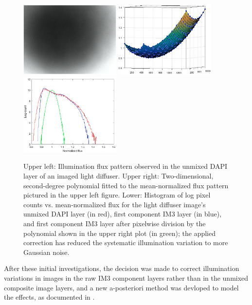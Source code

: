 \documentclass[letterpaper,11pt]{article}
\begin{document}
\begin{figure}[ht]
\centering
\includegraphics[width=0.45\textwidth]{images/first_unmixed_DAPI_meanimage}
\includegraphics[width=0.45\textwidth]{images/first_DAPI_meanimage_polynomial_fit}
\includegraphics[width=0.45\textwidth]{images/first_DAPI_meanimage_corrected_flux}
\caption{\footnotesize Upper left: Illumination flux pattern observed in the unmixed DAPI layer of an imaged light diffuser. Upper right: Two-dimensional, second-degree polynomial fitted to the mean-normalized flux pattern pictured in the upper left figure. Lower: Histogram of log pixel counts vs. mean-normalized flux for the light diffuser image's unmixed DAPI layer (in red), first component IM3 layer (in blue), and first component IM3 layer after pixelwise division by the polynomial shown in the upper right plot (in green); the applied correction has reduced the systematic illumination variation to more Gaussian noise.}
\label{fig:first_flatfielding}
\end{figure}

After these initial investigations, the decision was made to correct illumination variations in images in the raw IM3 component layers rather than in the unmixed composite image layers, and a new a-posteriori method was devloped to model the effects, as documented in \cite{Alex_flatfielding_2}.
\end{document}
